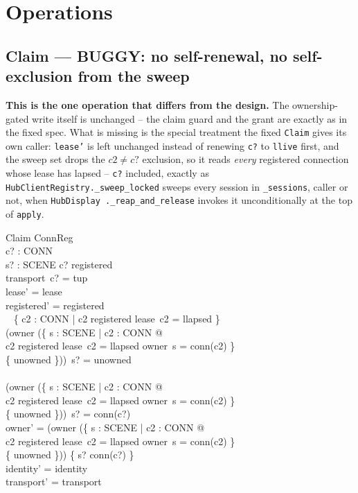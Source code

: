 \documentclass[a4paper,10pt,fleqn]{article}
\begin{document}
\section{Operations}

\subsection{Claim --- BUGGY: no self-renewal, no self-exclusion from the sweep}
\label{sec:claim}

\textbf{This is the one operation that differs from the design.} The
ownership-gated write itself is unchanged -- the claim guard and the
grant are exactly as in the fixed spec. What is missing is the special
treatment the fixed \texttt{Claim} gives its own caller: \texttt{lease'}
is left unchanged instead of renewing \texttt{c?} to \texttt{llive}
first, and the sweep set drops the \(c2 \neq c?\) exclusion, so it reads
\emph{every} registered connection whose lease has lapsed --
\texttt{c?} included, exactly as
\texttt{HubClientRegistry.\_sweep\_locked} sweeps every session in
\texttt{\_sessions}, caller or not, when \texttt{HubDisplay
.\_reap\_and\_release} invokes it unconditionally at the top of
\texttt{apply}.

\begin{schema}{Claim}
  \Delta ConnReg \\
  c? : CONN \\
  s? : SCENE
\where
  c? \in registered \\
  transport~c? = tup \\
  lease' = lease \\
  registered' = registered \setminus \\
  \quad~ \{ c2 : CONN | c2 \in registered \land lease~c2 = llapsed \} \\
  (owner \oplus (\{ s : SCENE | \exists c2 : CONN @ \\
    \qquad c2 \in registered \land lease~c2 = llapsed
    \land owner~s = conn(c2) \} \\
    \qquad \cross \{ unowned \}))~s? = unowned \\
  \lor \\
  (owner \oplus (\{ s : SCENE | \exists c2 : CONN @ \\
    \qquad c2 \in registered \land lease~c2 = llapsed
    \land owner~s = conn(c2) \} \\
    \qquad \cross \{ unowned \}))~s? = conn(c?) \\
  owner' = (owner \oplus (\{ s : SCENE | \exists c2 : CONN @ \\
    \qquad c2 \in registered \land lease~c2 = llapsed
    \land owner~s = conn(c2) \} \\
    \qquad \cross \{ unowned \})) \oplus \{ s? \mapsto conn(c?) \} \\
  identity' = identity \\
  transport' = transport
\end{schema}
\end{document}
